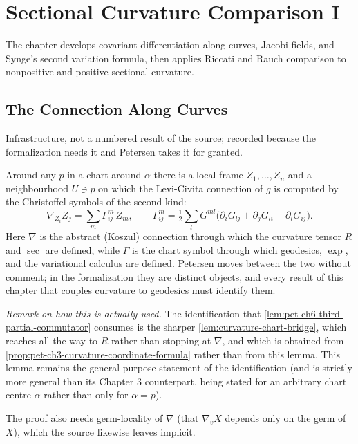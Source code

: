 \chapter{Sectional Curvature Comparison I}
\label{chap:pet-sectional-curvature-comparison-i}

The chapter develops covariant differentiation along curves, Jacobi fields, and
Synge's second variation formula, then applies Riccati and Rauch comparison to
nonpositive and positive sectional curvature.

\section{The Connection Along Curves}

\begin{lemma}
  \label{lem:chart-connection-bridge}


  Infrastructure, not a numbered result of the source; recorded because the
  formalization needs it and Petersen takes it for granted.

  Around any $p$ in a chart around $\alpha$ there is a local frame $Z_1,\dots,Z_n$
  and a neighbourhood $U\ni p$ on which the Levi-Civita connection of $g$ is
  computed by the Christoffel symbols of the second kind:
  \[
    \nabla_{Z_i}Z_j=\sum_m\Gamma^m_{ij}\,Z_m,\qquad
    \Gamma^m_{ij}=\tfrac12\sum_lG^{ml}\big(\partial_iG_{lj}+\partial_jG_{li}
      -\partial_lG_{ij}\big).
  \]
  Here $\nabla$ is the abstract (Koszul) connection through which the curvature
  tensor $R$ and $\sec$ are defined, while $\Gamma$ is the chart symbol through
  which geodesics, $\exp$, and the variational calculus are defined. Petersen
  moves between the two without comment; in the formalization they are distinct
  objects, and every result of this chapter that couples curvature to geodesics
  must identify them.

  \emph{Remark on how this is actually used.} The identification that
  \cref{lem:pet-ch6-third-partial-commutator} consumes is the sharper
  \cref{lem:curvature-chart-bridge}, which reaches all the way to $R$ rather than
  stopping at $\nabla$, and which is obtained from
  \cref{prop:pet-ch3-curvature-coordinate-formula} rather than from this lemma.
  This lemma remains the general-purpose statement of the identification (and is
  strictly more general than its Chapter 3 counterpart, being stated for an
  arbitrary chart centre $\alpha$ rather than only for $\alpha=p$).

  The proof also needs germ-locality of $\nabla$ (that $\nabla_vX$ depends only on
  the germ of $X$), which the source likewise leaves implicit.
\end{lemma}

